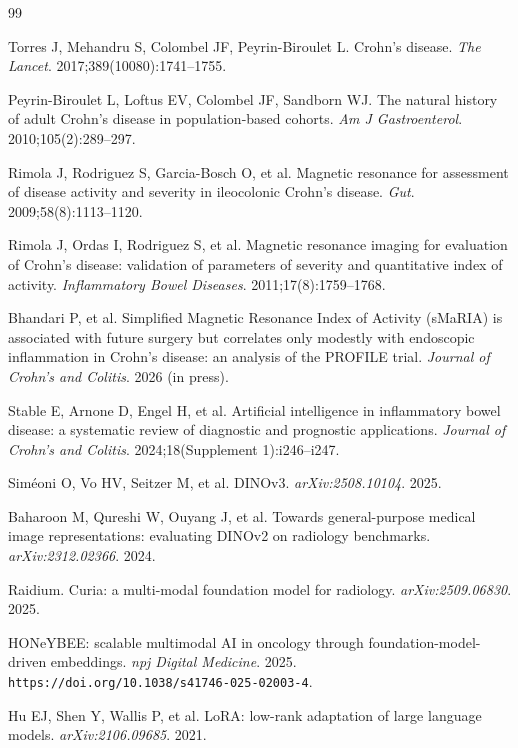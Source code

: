 \documentclass[11pt]{article}
\begin{document}
\begin{thebibliography}{99}

Torres J, Mehandru S, Colombel JF, Peyrin-Biroulet L.
Crohn's disease.
\textit{The Lancet}. 2017;389(10080):1741--1755.

Peyrin-Biroulet L, Loftus EV, Colombel JF, Sandborn WJ.
The natural history of adult Crohn's disease in population-based cohorts.
\textit{Am J Gastroenterol}. 2010;105(2):289--297.

Rimola J, Rodriguez S, Garcia-Bosch O, et al.
Magnetic resonance for assessment of disease activity and severity in ileocolonic Crohn's disease.
\textit{Gut}. 2009;58(8):1113--1120.

Rimola J, Ordas I, Rodriguez S, et al.
Magnetic resonance imaging for evaluation of Crohn's disease: validation of parameters of severity and quantitative index of activity.
\textit{Inflammatory Bowel Diseases}. 2011;17(8):1759--1768.

Bhandari P, et al.
Simplified Magnetic Resonance Index of Activity (sMaRIA) is associated with future surgery but correlates only modestly with endoscopic inflammation in Crohn's disease: an analysis of the PROFILE trial.
\textit{Journal of Crohn's and Colitis}. 2026 (in press).

Stable E, Arnone D, Engel H, et al.
Artificial intelligence in inflammatory bowel disease: a systematic review of diagnostic and prognostic applications.
\textit{Journal of Crohn's and Colitis}. 2024;18(Supplement 1):i246--i247.

Sim\'eoni O, Vo HV, Seitzer M, et al.
DINOv3.
\textit{arXiv:2508.10104}. 2025.

Baharoon M, Qureshi W, Ouyang J, et al.
Towards general-purpose medical image representations: evaluating DINOv2 on radiology benchmarks.
\textit{arXiv:2312.02366}. 2024.

Raidium.
Curia: a multi-modal foundation model for radiology.
\textit{arXiv:2509.06830}. 2025.

HONeYBEE: scalable multimodal AI in oncology through foundation-model-driven embeddings.
\textit{npj Digital Medicine}. 2025. \texttt{https://doi.org/10.1038/s41746-025-02003-4}.

Hu EJ, Shen Y, Wallis P, et al.
LoRA: low-rank adaptation of large language models.
\textit{arXiv:2106.09685}. 2021.


\end{thebibliography}
\end{document}

